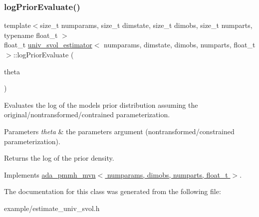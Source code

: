 \subsubsection{\texorpdfstring{log\+Prior\+Evaluate()}{logPriorEvaluate()}}
{\footnotesize\ttfamily template$<$size\+\_\+t numparams, size\+\_\+t dimstate, size\+\_\+t dimobs, size\+\_\+t numparts, typename float\+\_\+t $>$ \\
float\+\_\+t \hyperlink{classuniv__svol__estimator}{univ\+\_\+svol\+\_\+estimator}$<$ numparams, dimstate, dimobs, numparts, float\+\_\+t $>$\+::log\+Prior\+Evaluate (\begin{DoxyParamCaption}\item[{const \hyperlink{classparamPack}{param\+Pack}$<$ float\+\_\+t $>$ \&}]{theta }\end{DoxyParamCaption})\hspace{0.3cm}{\ttfamily [virtual]}}



Evaluates the log of the model\textquotesingle{}s prior distribution assuming the original/nontransformed/contrained parameterization. 


\begin{DoxyParams}{Parameters}
{\em theta} & the parameters argument (nontransformed/constrained parameterization). \\
\hline
\end{DoxyParams}
\begin{DoxyReturn}{Returns}
the log of the prior density. 
\end{DoxyReturn}


Implements \hyperlink{classada__pmmh__mvn_af946eae70a63045515ed7830c35106dc}{ada\+\_\+pmmh\+\_\+mvn$<$ numparams, dimobs, numparts, float\+\_\+t $>$}.



The documentation for this class was generated from the following file\+:\begin{DoxyCompactItemize}
\item 
example/estimate\+\_\+univ\+\_\+svol.\+h\end{DoxyCompactItemize}
